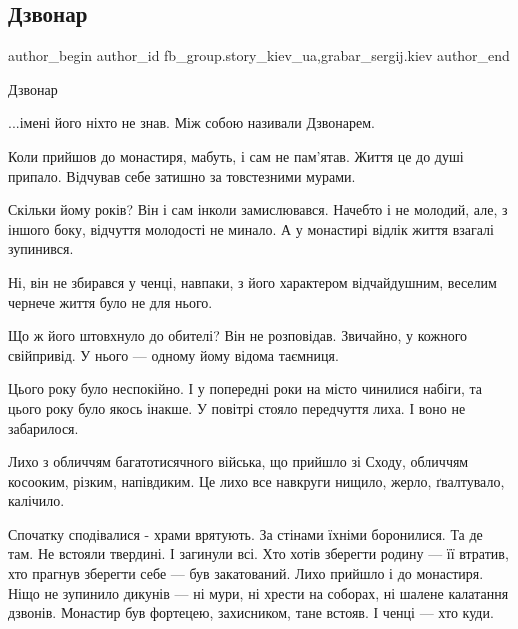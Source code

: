  
 
 
 
 
 
\subsection{Дзвонар}
\label{sec:17_02_2022.fb.fb_group.story_kiev_ua.1.dzvonar}
 
\ifcmt
 author_begin
   author_id fb_group.story_kiev_ua,grabar_sergij.kiev
 author_end
\fi

Дзвонар

...імені його ніхто не знав. Між собою називали Дзвонарем.

Коли прийшов до монастиря, мабуть, і сам не пам'ятав. Життя це до душі припало.
Відчував себе затишно за товстезними мурами.


Скільки йому років? Він і сам інколи замислювався. Начебто і не молодий, але, з
іншого боку, відчуття молодості не минало. А у монастирі відлік життя взагалі
зупинився.

Ні, він не збирався у ченці, навпаки, з його характером відчайдушним, веселим
чернече життя було не для нього.

Що ж його штовхнуло до обителі? Він не розповідав. Звичайно, у кожного
свійпривід. У нього — одному йому відома таємниця.

Цього року було неспокійно. І у попередні роки на місто чинилися набіги, та
цього року було якось інакше. У повітрі стояло передчуття лиха. І воно не
забарилося.

Лихо з обличчям багатотисячного війська, що прийшло зі Сходу, обличчям
косооким, різким, напівдиким. Це лихо все навкруги нищило, жерло, ґвалтувало,
калічило.

Спочатку сподівалися - храми врятують. За стінами їхніми боронилися. Та де там.
Не встояли твердині. І загинули всі. Хто хотів зберегти родину — її втратив,
хто прагнув зберегти себе — був закатований. Лихо прийшло і до монастиря. Ніщо
не зупинило дикунів — ні мури, ні хрести на соборах, ні шалене калатання
дзвонів. Монастир був фортецею, захисником, тане встояв. І ченці — хто куди.

